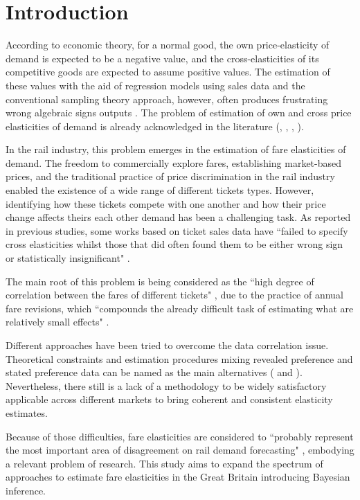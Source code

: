\chapter{Introduction}
\label{chp:introduction}

According to economic theory, for a normal good, the own price-elasticity of demand is expected to be a negative value, and the cross-elasticities of its competitive goods are expected to assume positive values. The estimation of these values with the aid of regression models using sales data and the conventional sampling theory approach, however, often produces frustrating wrong algebraic signs outputs \citep{liu2009}. The problem of estimation of own and cross price elasticities of demand is already acknowledged in the literature (\cite{griffiths1988}, \cite{geweke1986}, \cite{montgomery1999}, \cite{liu2009}).

In the rail industry, this problem emerges in the estimation of fare elasticities of demand. The freedom to commercially explore fares, establishing market-based prices, and the traditional practice of price discrimination in the rail industry enabled the existence of a wide range of different tickets types. However, identifying how these tickets compete with one another and how their price change affects theirs each other demand has been a challenging task. As reported in previous studies, some works based on ticket sales data have ``failed to specify cross elasticities whilst those that did often found them to be either wrong sign or statistically insignificant" \citep[p.~6]{wardman2003}.

The main root of this problem is being considered as the ``high degree of correlation between the fares of different tickets" \citep[p.~6]{wardman2003}, due to the practice of annual fare revisions, which ``compounds the already difficult task of estimating what are relatively small effects" \citep[p.~6]{wardman2003}.

Different approaches have been tried to overcome the data correlation issue. Theoretical constraints and estimation procedures mixing revealed preference and stated preference data can be named as the main alternatives (\cite{wardman2003} and \cite{its-systra-report}). Nevertheless, there still is a lack of a methodology to be widely satisfactory applicable across different markets to bring coherent and consistent elasticity estimates. 

Because of those difficulties, fare elasticities are considered to ``probably represent the most important area of disagreement on rail demand forecasting" \citep{its-systra-met}, embodying a relevant problem of research. This study aims to expand the spectrum of approaches to estimate fare elasticities in the Great Britain introducing Bayesian inference.

